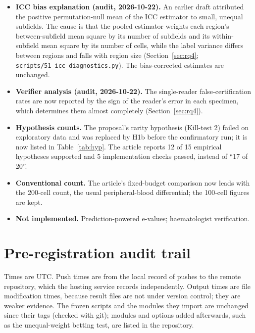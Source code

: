 \documentclass[11pt]{article}
\theoremstyle{remark}
\theoremstyle{definition}
\begin{document}
\begin{itemize}
\item \textbf{ICC bias explanation (audit, 2026-10-22).} An earlier draft attributed the positive permutation-null mean of the ICC estimator to small, unequal subfields. The cause is that the pooled estimator weights each region's between-subfield mean square by its number of subfields and its within-subfield mean square by its number of cells, while the label variance differs between regions and falls with region size (Section~\ref{sec:rq4}; \texttt{scripts/51\_icc\_diagnostics.py}). The bias-corrected estimates are unchanged.
\item \textbf{Verifier analysis (audit, 2026-10-22).} The single-reader false-certification rates are now reported by the sign of the reader's error in each specimen, which determines them almost completely (Section~\ref{sec:rq4}).
\item \textbf{Hypothesis counts.} The proposal's rarity hypothesis (Kill-test 2) failed on exploratory data and was replaced by H1b before the confirmatory run; it is now listed in Table~\ref{tab:hyp}. The article reports 12 of 15 empirical hypotheses supported and 5 implementation checks passed, instead of ``17 of 20''.
\item \textbf{Conventional count.} The article's fixed-budget comparison now leads with the 200-cell count, the usual peripheral-blood differential; the 100-cell figures are kept.
\item \textbf{Not implemented.} Prediction-powered e-values; haematologist verification.
\end{itemize}

\section{Pre-registration audit trail}\label{app:audit}
Times are UTC. Push times are from the local record of pushes to the remote repository, which the hosting service records independently. Output times are file modification times, because result files are not under version control; they are weaker evidence. The frozen scripts and the modules they import are unchanged since their tags (checked with git); modules and options added afterwards, such as the unequal-weight betting test, are listed in the repository.
\end{document}
